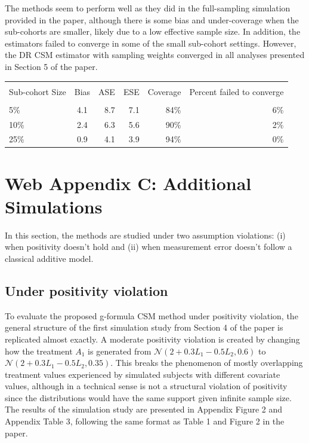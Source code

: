 \documentclass[12pt]{article}
\newcounter{tblcap}
\def\tblhead#1{\hline\\[-9pt]#1\\\hline\\[-9.75pt]}
\def\lastline{\\\hline}
\begin{document}
The methods seem to perform well as they did in the full-sampling simulation provided in the paper, although there is some bias and under-coverage when the sub-cohorts are smaller, likely due to a low effective sample size. In addition, the estimators failed to converge in some of the small sub-cohort settings. However, the DR CSM estimator with sampling weights converged in all analyses presented in Section 5 of the paper.

\begin{table}[h]
{\tabcolsep=6.25pt
\begin{tabular}{@{}lcrrrr@{}}
\tblhead{Sub-cohort Size & Bias & ASE & ESE & Coverage & Percent failed to converge}
5\% & 4.1 & 8.7 & 7.1 & 84\% & 6\% \\
10\% & 2.4 & 6.3 & 5.6 & 90\% & 2\% \\
25\% & 0.9 & 4.1 & 3.9 & 94\% & 0\%
\lastline
\end{tabular}}
\end{table}

\section{Web Appendix C: Additional Simulations}

In this section, the methods are studied under two assumption violations: (i) when positivity doesn't hold and (ii) when measurement error doesn't follow a classical additive model.

\subsection{Under positivity violation}

To evaluate the proposed g-formula CSM method under positivity violation, the general structure of the first simulation study from Section 4 of the paper is replicated almost exactly. A moderate positivity violation is created by changing how the treatment $A_{1}$ is generated from $\mathcal{N}(2 + 0.3L_{1} - 0.5L_{2}, 0.6)$ to $\mathcal{N}(2 + 0.3L_{1} - 0.5L_{2}, 0.35)$. This breaks the phenomenon of mostly overlapping treatment values experienced by simulated subjects with different covariate values, although in a technical sense is not a structural violation of positivity since the distributions would have the same support given infinite sample size. The results of the simulation study are presented in Appendix Figure 2 and Appendix Table 3, following the same format as Table 1 and Figure 2 in the paper.
\end{document}
